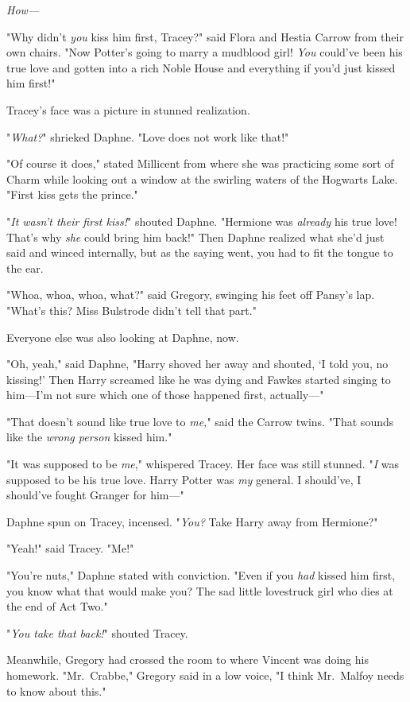 \emph{How---}

"Why didn't \emph{you} kiss him first, Tracey?" said Flora and Hestia Carrow 
from their own chairs. "Now Potter's going to marry a mudblood girl! \emph{You} 
could've been his true love and gotten into a rich Noble House and everything 
if you'd just kissed him first!"

Tracey's face was a picture in stunned realization.

"\emph{What?}" shrieked Daphne. "Love does not work like that!"

"Of course it does," stated Millicent from where she was practicing some sort 
of Charm while looking out a window at the swirling waters of the Hogwarts 
Lake. "First kiss gets the prince."

"\emph{It wasn't their first kiss!}" shouted Daphne. "Hermione was 
\emph{already} his true love! That's why \emph{she} could bring him back!" Then 
Daphne realized what she'd just said and winced internally, but as the saying 
went, you had to fit the tongue to the ear.

"Whoa, whoa, whoa, what?" said Gregory, swinging his feet off Pansy's lap. 
"What's this? Miss Bulstrode didn't tell that part."

Everyone else was also looking at Daphne, now.

"Oh, yeah," said Daphne, "Harry shoved her away and shouted, `I told you, no 
kissing!' Then Harry screamed like he was dying and Fawkes started singing to 
him---I'm not sure which one of those happened first, actually---"

"That doesn't sound like true love to \emph{me,}" said the Carrow twins. "That 
sounds like the \emph{wrong person} kissed him."

"It was supposed to be \emph{me}," whispered Tracey. Her face was still 
stunned. "\emph{I} was supposed to be his true love. Harry Potter was \emph{my} 
general. I should've, I should've fought Granger for him---"

Daphne spun on Tracey, incensed. "\emph{You?} Take Harry away from Hermione?"

"Yeah!" said Tracey. "Me!"

"You're nuts," Daphne stated with conviction. "Even if you \emph{had} kissed 
him first, you know what that would make you? The sad little lovestruck girl 
who dies at the end of Act Two."

"\emph{You take that back!}" shouted Tracey.

Meanwhile, Gregory had crossed the room to where Vincent was doing his 
homework. "Mr.~Crabbe," Gregory said in a low voice, "I think Mr.~Malfoy needs 
to know about this."
\sbreak
